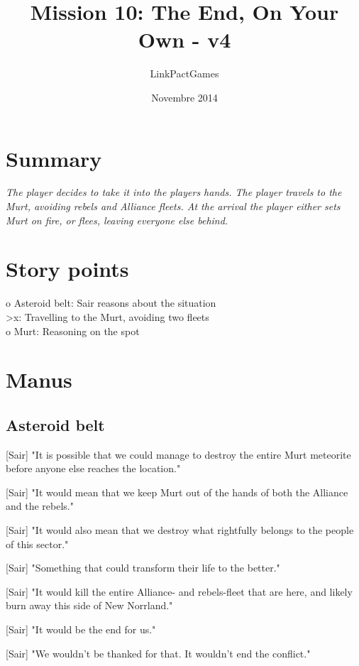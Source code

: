 \documentclass[a4paper,12pt]{article}
\begin{document}
\title{Mission 10: The End, On Your Own - v4}
\author{LinkPactGames}
\date{Novembre 2014}
\maketitle

\section{Summary}

\textit{The player decides to take it into the players hands. The player travels to the Murt, avoiding
rebels and Alliance fleets. At the arrival the player either sets Murt on fire, or flees, leaving everyone else behind.}

\section{Story points}

o Asteroid belt: Sair reasons about the situation\\
\textgreater x: Travelling to the Murt, avoiding two fleets\\
o Murt: Reasoning on the spot

\section{Manus}

\subsection{Asteroid belt}

[Sair] "It is possible that we could manage to destroy the entire Murt meteorite before anyone else
reaches the location."

[Sair] "It would mean that we keep Murt out of the hands of both the Alliance and the rebels."

[Sair] "It would also mean that we destroy what rightfully belongs to the people of this sector."

[Sair] "Something that could transform their life to the better."

[Sair] "It would kill the entire Alliance- and rebels-fleet that are here, and likely burn away this side of New Norrland."

[Sair] "It would be the end for us."

[Sair] "We wouldn't be thanked for that. It wouldn't end the conflict." 
\end{document}
